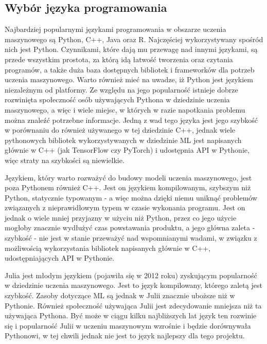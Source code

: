 \documentclass[polish,12pt]{aghthesis}
\begin{document}
\subsection{Wybór języka programowania}
\par
Najbardziej popularnymi językami programowania w obszarze uczenia maszynowego są Python, C++, Java oraz R. Najczęściej wykorzystywany spośród nich jest Python. Czynnikami, które dają mu przewagę nad innymi językami, są przede wszystkim prostota, za którą idą łatwość tworzenia oraz czytania programów, a także duża baza dostępnych bibliotek i frameworków dla potrzeb uczenia maszynowego. Warto również mieć na uwadze, iż Python jest językiem niezależnym od platformy. Ze względu na jego popularność istnieje dobrze rozwinięta społeczność osób używających Pythona w dziedzinie uczenia maszynowego, a więc i wiele miejsc, w których w razie napotkania problemu można znaleźć potrzebne informacje. Jedną z wad tego języka jest jego szybkość w porównaniu do również używanego w tej dziedzinie C++, jednak wiele pythonowych bibliotek wykorzystywanych w dziedzinie ML jest napisanych głównie w C++ (jak TensorFlow czy PyTorch) i udostępnia API w Pythonie, więc straty na szybkości są niewielkie.
\par
Językiem, który warto rozważyć do budowy modeli uczenia maszynowego, jest poza Pythonem również C++. Jest on językiem kompilowanym, szybszym niż Python, statycznie typowanym - a więc można dzięki niemu uniknąć problemów związanych z nieprawidłowym typem w czasie wykonania programu. Jest on jednak o wiele mniej przyjazny w użyciu niż Python, przez co jego użycie mogłoby znacznie wydłużyć czas powstawania produktu, a jego główna zaleta - szybkość - nie jest w stanie przeważyć nad wspomnianymi wadami, w związku z możliwością wykorzystania bibliotek napisanych głównie w C++, udostępniających API w Pythonie.
\par
Julia jest młodym językiem (pojawiła się w 2012 roku) zyskującym popularność w dziedzinie uczenia maszynowego. Jest to język kompilowany, którego zaletą jest szybkość. Zasoby dotyczące ML są jednak w Julii znacznie uboższe niż w Pythonie. Również społeczność używająca Julii jest zdecydowanie mniejsza niż ta używająca Pythona. Być może w ciągu kilku najbliższych lat język ten rozwinie się i popularność Julii w uczeniu maszynowym wzrośnie i będzie dorównywała Pythonowi, w tej chwili jednak nie jest to język najlepszy dla tego projektu.
\par
\end{document}
